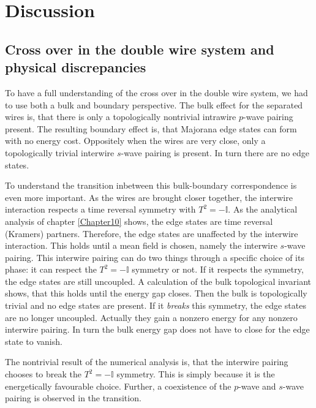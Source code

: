 \chapter{Discussion} 

\label{Chapter12} 

\section{Cross over in the double wire system and physical discrepancies} \label{sec.Discussion.2wires.crossover}
To have a full understanding of the cross over in the double wire system, we had to use both a bulk and boundary perspective. The bulk effect for the separated wires is, that there is only a topologically nontrivial intrawire $p$-wave pairing present. The resulting boundary effect is, that Majorana edge states can form with no energy cost. Oppositely when the wires are very close, only a topologically trivial interwire $s$-wave pairing is present. In turn there are no edge states. 

To understand the transition inbetween this bulk-boundary correspondence is even more important. As the wires are brought closer together, the interwire interaction respects a time reversal symmetry with $T^2 = - \mathbb{I}$. As the analytical analysis of chapter \ref{Chapter10} shows, the edge states are time reversal (Kramers) partners. Therefore, the edge states are unaffected by the interwire interaction. This holds until a mean field is chosen, namely the interwire $s$-wave pairing. This interwire pairing can do two things through a specific choice of its phase: it can respect the $T^2 = - \mathbb{I}$ symmetry or not. If it respects the symmetry, the edge states are still uncoupled. A calculation of the bulk topological invariant shows, that this holds until the energy gap closes. Then the bulk is topologically trivial and no edge states are present. If it \textit{breaks} this symmetry, the edge states are no longer uncoupled. Actually they gain a nonzero energy for any nonzero interwire pairing. In turn the bulk energy gap does not have to close for the edge state to vanish. 

The nontrivial result of the numerical analysis is, that the interwire pairing chooses to break the $T^2 = -\mathbb{I}$ symmetry. This is simply because it is the energetically favourable choice. Further, a coexistence of the $p$-wave and $s$-wave pairing is observed in the transition. 

